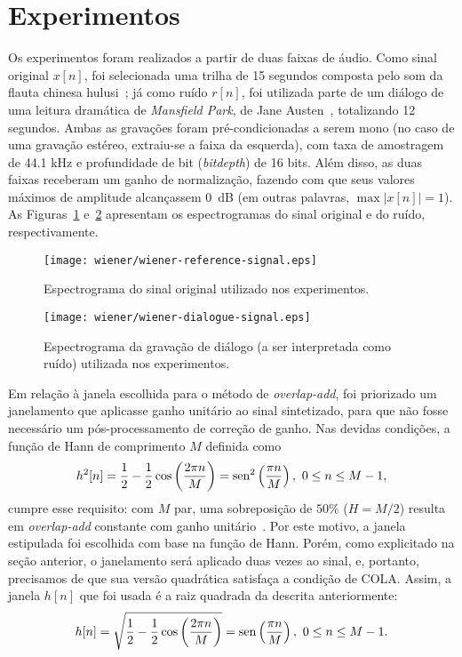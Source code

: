 \section{Experimentos}
\label{section:wf:experiments}

Os experimentos foram realizados a partir de duas faixas de áudio. Como sinal original $x[n]$, foi selecionada uma trilha de 15 segundos composta pelo som da flauta chinesa hulusi~\cite{wiener-reference-source}; já como ruído $r[n]$, foi utilizada parte de um diálogo de uma leitura dramática de \textit{Mansfield Park}, de Jane Austen~\cite{wiener-dialogue-source}, totalizando 12 segundos. Ambas as gravações foram pré-condicionadas a serem mono (no caso de uma gravação estéreo, extraiu-se a faixa da esquerda), com taxa de amostragem de 44.1 kHz e profundidade de bit (\textit{bitdepth}) de 16 bits. Além disso, as duas faixas receberam um ganho de normalização, fazendo com que seus valores máximos de amplitude alcançassem 0~dB (em outras palavras, $\max \left| x[n] \right| = 1$). As Figuras~\ref{fig:wf:spectogram-reference} e~\ref{fig:wf:spectogram-dialogue} apresentam os espectrogramas do sinal original e do ruído, respectivamente.
\begin{figure}[!ht]
    \centering
    \texttt{[image: wiener/wiener-reference-signal.eps]}
    \caption[Espetrograma do sinal original usado nos experimentos]{Espectrograma do sinal original utilizado nos experimentos.}
    \label{fig:wf:spectogram-reference}
\end{figure}
\begin{figure}[!ht]
    \centering
    \texttt{[image: wiener/wiener-dialogue-signal.eps]}
    \caption[Espetrograma do ruído usado nos experimentos]{Espectrograma da gravação de diálogo (a ser interpretada como ruído) utilizada nos experimentos.}
    \label{fig:wf:spectogram-dialogue}
\end{figure}

Em relação à janela escolhida para o método de \textit{overlap-add}, foi priorizado um janelamento que aplicasse ganho unitário ao sinal sintetizado, para que não fosse necessário um pós-processamento de correção de ganho. Nas devidas condições, a função de Hann de comprimento $M$ definida como
\begin{equation}
    h^2[n] = \frac{1}{2} - \frac{1}{2}\cos\left(\frac{2\pi n}{M}\right) = \operatorname{sen}^2\left( \frac{\pi n}{M} \right),\ 0 \leq n \leq M-1,
\end{equation}
cumpre esse requisito: com $M$ par, uma sobreposição de $50\%$ ($H = M/2$) resulta em \textit{overlap-add} constante com ganho unitário~\cite{heinzel-2002}. Por este motivo, a janela estipulada foi escolhida com base na função de Hann. Porém, como explicitado na seção anterior, o janelamento será aplicado duas vezes ao sinal, e, portanto, precisamos de que sua versão quadrática satisfaça a condição de COLA. Assim, a janela $h[n]$ que foi usada é a raiz quadrada da descrita anteriormente:
\begin{equation}
    h[n] = \sqrt{\frac{1}{2} - \frac{1}{2}\cos\left(\frac{2\pi n}{M}\right)} = \operatorname{sen}\left( \frac{\pi n}{M} \right),\ 0 \leq n \leq  M-1.
\end{equation}

